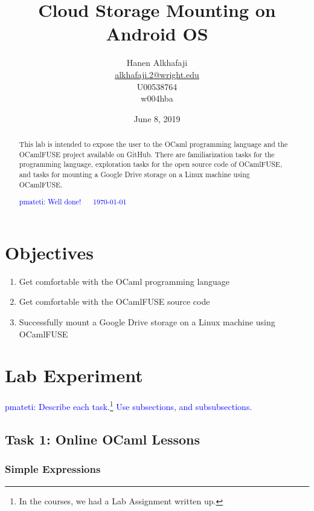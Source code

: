 \documentclass{article}
\newcommand{\PM}[1]{\textcolor{Blue}{pmateti: #1}}%
\begin{document}
\title{Cloud Storage Mounting on Android OS}
\author{Hanen Alkhafaji \\ \url{alkhafaji.2@wright.edu} \\ U00538764 \\ w004hba}
\date{June 8, 2019}
\maketitle


\begin{abstract}                %
This lab is intended to expose the user to the OCaml programming
language and the OCamlFUSE project available on GitHub. There are
familiarization tasks for the programming language, exploration tasks
for the open source code of OCamlFUSE, and tasks for mounting a Google
Drive storage on a Linux machine using OCamlFUSE.

\PM{Well done! ~~ \today}
\end{abstract}

\tableofcontents                %

\section{Objectives}

\begin{enumerate}
     \item Get comfortable with the OCaml programming language
     \item Get comfortable with the OCamlFUSE source code
     \item Successfully mount a Google Drive storage on a Linux machine using OCamlFUSE
\end{enumerate}

\section{Lab Experiment}


\PM{Describe each task.\footnote{In the courses, we had a Lab Assignment
  written up.}
Use subsections, and subsubsections.}

\subsection{Task 1: Online OCaml Lessons}

\subsubsection{Simple Expressions} %
\end{document}
